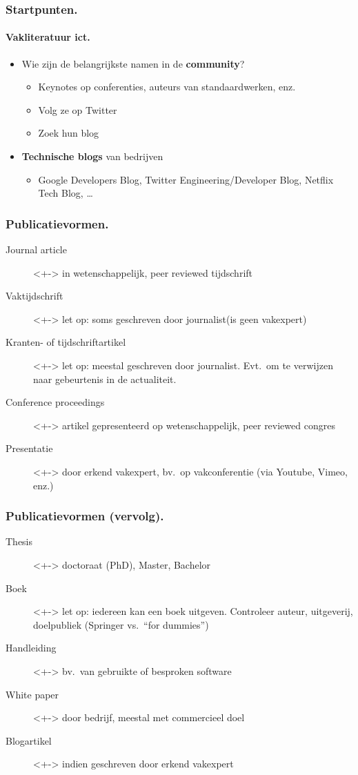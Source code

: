 \documentclass[aspectratio=169]{beamer}
\begin{document}
\begin{frame}
  \frametitle{Startpunten.}
  \framesubtitle{Vakliteratuur ict.}

  \begin{itemize}
    \item<+-> Wie zijn de belangrijkste namen in de \textbf{community}?
      \begin{itemize}
        \item Keynotes op conferenties, auteurs van standaardwerken, enz.
        \item Volg ze op Twitter
        \item Zoek hun blog
      \end{itemize}
    \item<+-> \textbf{Technische blogs} van bedrijven
      \begin{itemize}
        \item Google Developers Blog, Twitter Engineering/Developer Blog, Netflix Tech Blog, \dots
      \end{itemize}
  \end{itemize}
\end{frame}

\begin{frame}
  \frametitle{Publicatievormen.}

  \begin{description}
    \item[Journal article]<+-> in wetenschappelijk, peer reviewed tijdschrift
    \item[Vaktijdschrift]<+-> let op: soms geschreven door journalist\linebreak(is geen vakexpert)
    \item[Kranten- of tijdschriftartikel] <+-> let op: meestal geschreven door journalist. Evt.~om te verwijzen naar gebeurtenis in de actualiteit.
      \item[Conference proceedings]<+-> artikel gepresenteerd op wetenschappelijk, peer reviewed congres
      \item[Presentatie]<+-> door erkend vakexpert, bv.\ op vakconferentie (via Youtube, Vimeo, enz.)
  \end{description}
\end{frame}

\begin{frame}
  \frametitle{Publicatievormen (vervolg).}

  \begin{description}
    \item[Thesis]<+-> doctoraat (PhD), Master, Bachelor
    \item[Boek]<+-> let op: iedereen kan een boek uitgeven. Controleer auteur, uitgeverij, doelpubliek (Springer vs.\ ``for dummies'')
    \item[Handleiding]<+-> bv.\ van gebruikte of besproken software
    \item[White paper]<+-> door bedrijf, meestal met commercieel doel
    \item[Blogartikel]<+-> indien geschreven door erkend vakexpert
  \end{description}
\end{frame}
\end{document}
